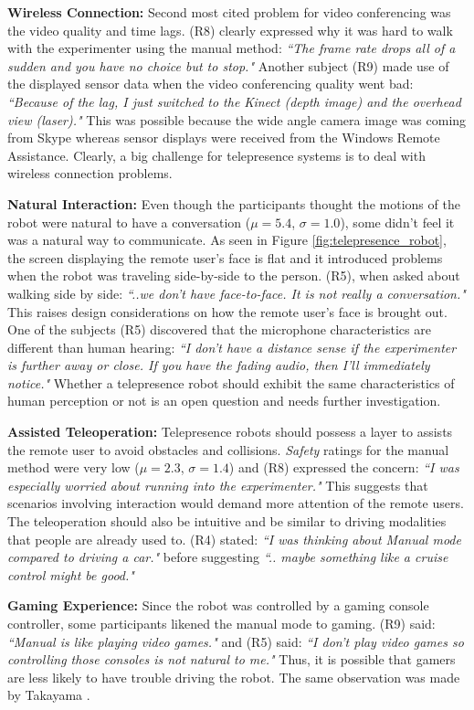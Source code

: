 \textbf{Wireless Connection:} Second most cited problem for video conferencing was the video quality and time lags. (R8) clearly expressed why it was hard to walk with the experimenter using the manual method: \emph{``The frame rate drops all of a sudden and you have no choice but to stop."} Another subject (R9) made use of the displayed sensor data when the video conferencing quality went bad: \emph{``Because of the lag, I just switched to the Kinect (depth image) and the overhead view (laser)."} This was possible because the wide angle camera image was coming from Skype whereas sensor displays were received from the Windows Remote Assistance. Clearly, a big challenge for telepresence systems is to deal with wireless connection problems.

\textbf{Natural Interaction:} Even though the participants thought the motions of the robot were natural to have a conversation ($\mu=5.4$, $\sigma=1.0$), some didn't feel it was a natural way to communicate. As seen in Figure \ref{fig:telepresence_robot}, the screen displaying the remote user's face is flat and it introduced problems when the robot was traveling side-by-side to the person. (R5), when asked about walking side by side: \emph{``..we don't have face-to-face. It is not really a conversation."} This raises design considerations on how the remote user's face is brought out. One of the subjects (R5) discovered that the microphone characteristics are different than human hearing: \emph{``I don't have a distance sense if the experimenter is further away or close. If you have the fading audio, then I'll immediately notice."} Whether a telepresence robot should exhibit the same characteristics of human perception or not is an open question and needs further investigation.

\textbf{Assisted Teleoperation:} Telepresence robots should possess a layer to assists the remote user to avoid obstacles and collisions. \emph{Safety} ratings for the manual method were very low ($\mu=2.3$, $\sigma=1.4$) and (R8) expressed the concern: \emph{``I was especially worried about running into the experimenter."} This suggests that scenarios involving interaction would demand more attention of the remote users. The teleoperation should also be intuitive and be similar to driving modalities that people are already used to. (R4) stated: \emph{``I was thinking about Manual mode compared to driving a car."} before suggesting \emph{``.. maybe something like a cruise control might be good."}

\textbf{Gaming Experience:} Since the robot was controlled by a gaming console controller, some participants likened the manual mode to gaming. (R9) said: \emph{``Manual is like playing video games."} and (R5) said: \emph{``I don't play video games so controlling those consoles is not natural to me."} Thus, it is possible that gamers are less likely to have trouble driving the robot. The same observation was made by Takayama \cite{takayama2011assisted}.

